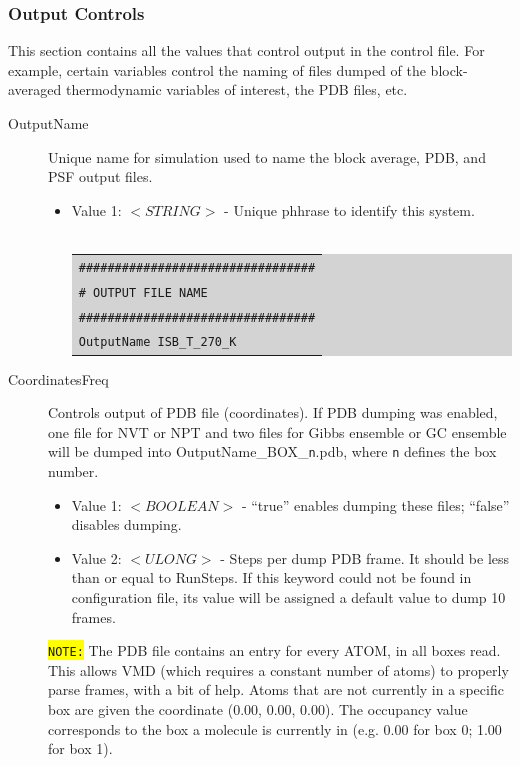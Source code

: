 \subsubsection{Output Controls}
This section contains all the values that control output in the control file.  For example, certain variables control the naming of files dumped of the block-averaged thermodynamic variables of interest, the PDB files, etc.
\begin{description}
\item [OutputName] Unique name for simulation used to name the block average, PDB, and PSF output files.
	\begin{itemize}
	\item Value 1: $<STRING>$ - Unique phhrase to identify this system.\\\\
	\colorbox{lightgray}{
	\begin{tabular}{l}
	\texttt{\#\#\#\#\#\#\#\#\#\#\#\#\#\#\#\#\#\#\#\#\#\#\#\#\#\#\#\#\#\#\#\#\#}\\
	\texttt{\#  OUTPUT FILE NAME}\\
	\texttt{\#\#\#\#\#\#\#\#\#\#\#\#\#\#\#\#\#\#\#\#\#\#\#\#\#\#\#\#\#\#\#\#\#}\\
	\texttt{OutputName  ISB\_T\_270\_K}\\
	\end{tabular}}
	\end{itemize}
\item [CoordinatesFreq] Controls output of PDB file (coordinates). If PDB dumping was enabled, one file for NVT or NPT and two files for Gibbs ensemble or GC ensemble will be dumped into OutputName\_BOX\_\texttt{n}.pdb, where \texttt{n} defines the box number.
	\begin{itemize}
	\item Value 1: $<BOOLEAN>$ - ``true'' enables dumping these files; ``false'' disables dumping.
	\item Value 2: $<ULONG>$ - Steps per dump PDB frame. It should be less than or equal to RunSteps. If this keyword could not be found in configuration file, its value will be assigned a default value to dump 10 frames.
	\end{itemize}
	\colorbox{yellow}{\texttt{NOTE:}} The PDB file contains an entry for every ATOM, in all boxes read. This allows VMD (which requires a constant number of atoms) to properly parse frames, with a bit of help. Atoms that are not currently in a specific box are given the coordinate (0.00, 0.00, 0.00). The occupancy value corresponds to the box a molecule is currently in (e.g. 0.00 for box 0; 1.00 for box 1).\\\\

\end{description}
